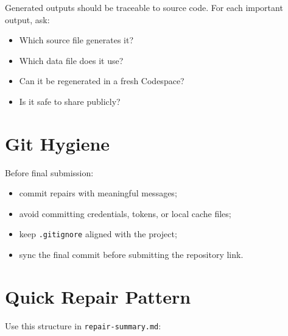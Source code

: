 \documentclass[
  letterpaper,
  DIV=11,
  numbers=noendperiod,
  oneside]{scrreprt}
\providecommand{\tightlist}{%
  \setlength{\itemsep}{0pt}\setlength{\parskip}{0pt}}
\begin{document}

Generated outputs should be traceable to source code. For each important
output, ask:

\begin{itemize}
\tightlist
\item
  Which source file generates it?
\item
  Which data file does it use?
\item
  Can it be regenerated in a fresh Codespace?
\item
  Is it safe to share publicly?
\end{itemize}

\section*{Git Hygiene}\label{git-hygiene}


Before final submission:

\begin{itemize}
\tightlist
\item
  commit repairs with meaningful messages;
\item
  avoid committing credentials, tokens, or local cache files;
\item
  keep \texttt{.gitignore} aligned with the project;
\item
  sync the final commit before submitting the repository link.
\end{itemize}

\section*{Quick Repair Pattern}\label{quick-repair-pattern}


Use this structure in \texttt{repair-summary.md}:
\end{document}
